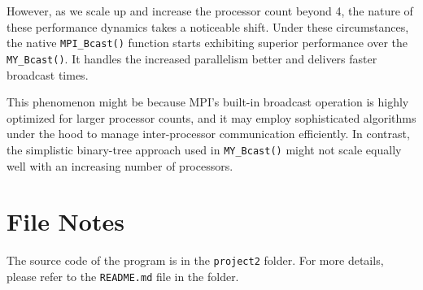 \documentclass[12pt,a4paper]{article}
\begin{document}
However, as we scale up and increase the processor count beyond 4, 
 the nature of these performance dynamics takes a noticeable shift. 
Under these circumstances, the native \texttt{MPI\_Bcast()} function starts 
 exhibiting superior performance over the \texttt{MY\_Bcast()}. 
It handles the increased parallelism better and delivers faster broadcast times. 

This phenomenon might be because MPI's built-in broadcast operation is 
 highly optimized for larger processor counts, 
 and it may employ sophisticated algorithms under the hood to 
 manage inter-processor communication efficiently. 
In contrast, 
 the simplistic binary-tree approach used in \texttt{MY\_Bcast()} might
 not scale equally well with an increasing number of processors.

\section*{File Notes}
The source code of the program is in the \texttt{project2} folder. 
For more details, please refer to the \texttt{README.md} file in the folder.
\end{document}
